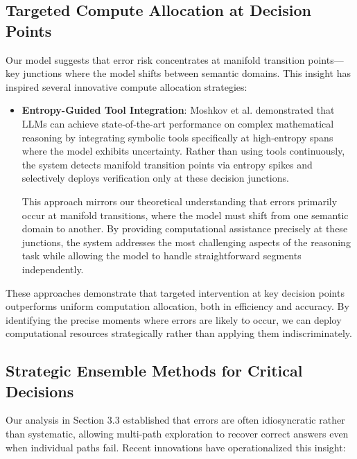 \documentclass{article}
\begin{document}
\subsection{Targeted Compute Allocation at Decision Points}

Our model suggests that error risk concentrates at manifold transition points—key junctions where the model shifts between semantic domains. This insight has inspired several innovative compute allocation strategies:

\begin{itemize}
\item \textbf{Entropy-Guided Tool Integration}: Moshkov et al. \citep{moshkov2025aimo} demonstrated that LLMs can achieve state-of-the-art performance on complex mathematical reasoning by integrating symbolic tools specifically at high-entropy spans where the model exhibits uncertainty. Rather than using tools continuously, the system detects manifold transition points via entropy spikes and selectively deploys verification only at these decision junctions.

  This approach mirrors our theoretical understanding that errors primarily occur at manifold transitions, where the model must shift from one semantic domain to another. By providing computational assistance precisely at these junctions, the system addresses the most challenging aspects of the reasoning task while allowing the model to handle straightforward segments independently.

\end{itemize}

These approaches demonstrate that targeted intervention at key decision points outperforms uniform computation allocation, both in efficiency and accuracy. By identifying the precise moments where errors are likely to occur, we can deploy computational resources strategically rather than applying them indiscriminately.

\subsection{Strategic Ensemble Methods for Critical Decisions}

Our analysis in Section 3.3 established that errors are often idiosyncratic rather than systematic, allowing multi-path exploration to recover correct answers even when individual paths fail. Recent innovations have operationalized this insight:
\end{document}
